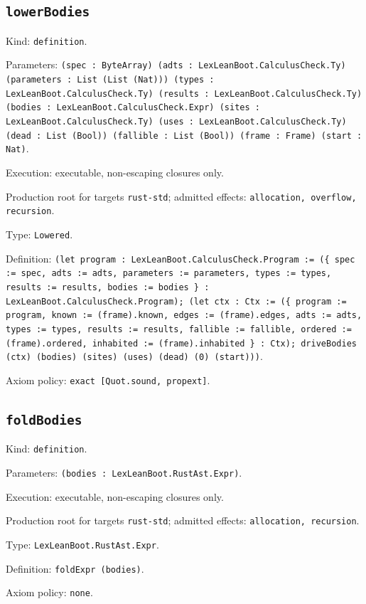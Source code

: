 \documentclass[11pt]{article}
\begin{document}
\subsection*{\texttt{lowerBodies}}
\noindent Kind: \texttt{definition}.\par
\noindent Parameters: \texttt{(spec : ByteArray) (adts : LexLeanBoot.CalculusCheck.Ty) (parameters : List (List (Nat))) (types : LexLeanBoot.CalculusCheck.Ty) (results : LexLeanBoot.CalculusCheck.Ty) (bodies : LexLeanBoot.CalculusCheck.Expr) (sites : LexLeanBoot.CalculusCheck.Ty) (uses : LexLeanBoot.CalculusCheck.Ty) (dead : List (Bool)) (fallible : List (Bool)) (frame : Frame) (start : Nat)}.\par
\noindent Execution: executable, non-escaping closures only.\par
\noindent Production root for targets \texttt{rust-std}; admitted effects: \texttt{allocation, overflow, recursion}.\par
\noindent Type: \texttt{Lowered}.\par
\noindent Definition: \texttt{(let program : LexLeanBoot.CalculusCheck.Program := (\{ spec := spec, adts := adts, parameters := parameters, types := types, results := results, bodies := bodies \} : LexLeanBoot.CalculusCheck.Program); (let ctx : Ctx := (\{ program := program, known := (frame).known, edges := (frame).edges, adts := adts, types := types, results := results, fallible := fallible, ordered := (frame).ordered, inhabited := (frame).inhabited \} : Ctx); driveBodies (ctx) (bodies) (sites) (uses) (dead) (0) (start)))}.\par
\noindent Axiom policy: \texttt{exact [Quot.sound, propext]}.\par
\subsection*{\texttt{foldBodies}}
\noindent Kind: \texttt{definition}.\par
\noindent Parameters: \texttt{(bodies : LexLeanBoot.RustAst.Expr)}.\par
\noindent Execution: executable, non-escaping closures only.\par
\noindent Production root for targets \texttt{rust-std}; admitted effects: \texttt{allocation, recursion}.\par
\noindent Type: \texttt{LexLeanBoot.RustAst.Expr}.\par
\noindent Definition: \texttt{foldExpr (bodies)}.\par
\noindent Axiom policy: \texttt{none}.\par
\end{document}
